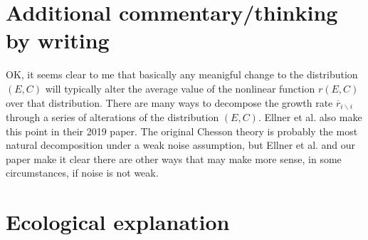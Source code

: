 \documentclass[letterpaper,11pt]{article}
\newcommand{\olr}{\overline{r}}
\newcommand{\bs}{\backslash}
\begin{document}
\section{Additional commentary/thinking by writing}

OK, it seems clear to me that basically any meanigful change to the distribution 
$(E,C)$ will typically alter the average value of the nonlinear function $r(E,C)$ 
over that distribution. There are many ways to decompose the growth rate 
$\olr_{i \bs i}$ through a series of alterations of the distribution $(E,C)$. 
Ellner et al. also make this point in their 2019 paper. The original Chesson 
theory is probably the most natural decomposition under a weak noise assumption,
but Ellner et al. and our paper make it clear there are other ways that may make
more sense, in some circumstances, if noise is not weak. 

\section{Ecological explanation}
\end{document}
